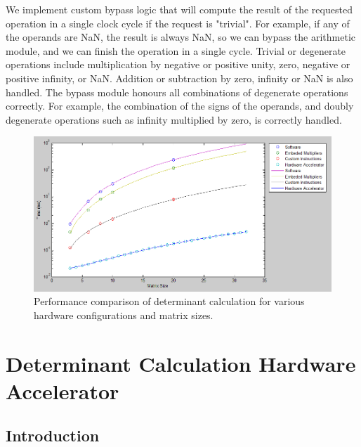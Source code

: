 \documentclass[]{article}
\begin{document}
We implement custom bypass logic that will compute the result of the requested operation in a single clock cycle if the request is "trivial". 
For example, if any of the operands are NaN, the result is always NaN, so we can bypass the arithmetic module, and we can finish the operation in a single cycle.
Trivial or degenerate operations include multiplication by negative or positive unity, zero, negative or positive infinity, or NaN. Addition or subtraction by zero, infinity or NaN is also handled.
The bypass module honours all combinations of degenerate operations correctly. For example, the combination of the signs of the operands, and doubly degenerate operations such as infinity multiplied by zero, is correctly handled.

\begin{figure}[bp]
	\begin{center}
		\includegraphics[width = \textwidth]{detcalcperf.PNG}
	\end{center}
	\caption{Performance comparison of determinant calculation for various hardware configurations and matrix sizes.}
	\label{fig:det_calc_perf}
\end{figure}




	
\clearpage

\section{Determinant Calculation Hardware Accelerator} %
\label{sec:determinant_calculation_hardware_accelerator}

\subsection{Introduction} %
\label{sub:introduction}
\end{document}
